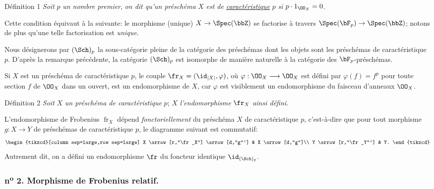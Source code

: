 \begin{statement}{Définition 1}
\emph{Soit} $p$ \emph{un nombre premier}, \emph{on dit qu'un préschéma} $X$ \emph{est de \underline{caractéristique}} $p$ \emph{si} $p\cdot 1_{\OO_X}=0$.
\end{statement}

Cette condition équivaut à la suivante: le morphisme (unique) $X\to\Spec(\bbZ)$ se factorise à travers $\Spec(\bF_p)\to\Spec(\bbZ)$; notons de plus qu'une telle factorisation est \emph{unique}.

Nous désignerons par $(\Sch)_p$ la sous-catégorie pleine de la catégorie des préschémas dont les objets sont les préschémas de caractéristique $p$. D'après la remarque précédente, la catégorie $(\Sch)_p$ est isomorphe de manière naturelle à la catégorie des $\bF_p$-préschémas.

Si $X$ est un préschéma de caractéristique $p$, le couple $\fr_X=(\id_{|X|},\varphi)$, où $\varphi:\OO_X\longrightarrow\OO_X$ est défini par $\varphi(f)=f^p$ pour toute section $f$ de $\OO_X$ dans un ouvert, est un endomorphisme de $X$, car $\varphi$ est visiblement un endomorphisme du faisceau d'anneaux $\OO_X$.

\begin{statement}{Définition 2}
\emph{Soit} $X$ \emph{un préschéma de caractéristique} $p$;  $X$ \emph{l'endomorphisme} $\fr_X$ \emph{ainsi défini}.
\end{statement}

L'endomorphisme de Frobenius $\operatorname{fr}_X$ dépend \emph{fonctoriellement} du préschéma $X$ de caractéristique $p$, c'est-à-dire que pour tout morphisme $g:X\to Y$ de préschémas de caractéristique $p$, le diagramme suivant est commutatif:
\[
\begin{tikzcd}[column sep=large,row sep=large]
X \arrow[r,"\fr_X"] \arrow[d,"g"'] & X \arrow[d,"g"]\\
Y \arrow[r,"\fr_Y"'] & Y.
\end{tikzcd}
\]
Autrement dit, on a défini un endomorphisme $\fr$ du foncteur identique $\id_{(\Sch)_p}$.

\subsubsection*{n\textsuperscript{o} 2. Morphisme de Frobenius relatif.}

